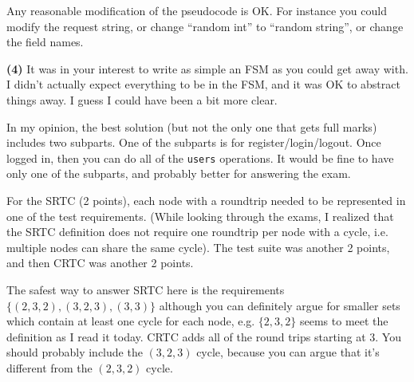 \documentclass[11pt,onecolumn,letterpaper]{article}
\newcounter{qNum}
\newcommand{\q}[1]{%
\textbf{(#1)}\stepcounter{qNum}}
\begin{document}
Any reasonable modification of the pseudocode is OK. For instance you could
modify the request string, or change ``random int'' to ``random string'', or
change the field names.

\newpage
\q{4} It was in your interest to write as simple an FSM as you could
get away with. I didn't actually expect everything to be in the FSM,
and it was OK to abstract things away. I guess I could have been a bit more clear.

In my opinion, the best solution (but not the only one that gets full marks)
includes two subparts. One of the subparts is for register/login/logout.
Once logged in, then you can do all of the {\tt users} operations. It would
be fine to have only one of the subparts, and probably better for answering the exam.

\begin{center}
\end{center}


For the SRTC (2 points), each
node with a roundtrip needed to be represented in one of the test
requirements.  (While looking through the exams, I realized that the
SRTC definition does not require one roundtrip per node with a cycle,
i.e. multiple nodes can share the same cycle).  The test suite was
another 2 points, and then CRTC was another 2 points.

The safest way to answer SRTC here is the requirements $\{(2, 3, 2), (3, 2, 3), (3, 3)\}$
although you can definitely argue for smaller sets which contain at least
one cycle for each node, e.g. $\{2, 3, 2\}$ seems to meet the definition as I read
it today. CRTC adds all of the round trips starting at $3$. You should probably include
the $(3, 2, 3)$ cycle, because you can argue that it's different from the $(2,3,2)$ cycle.
\end{document}
